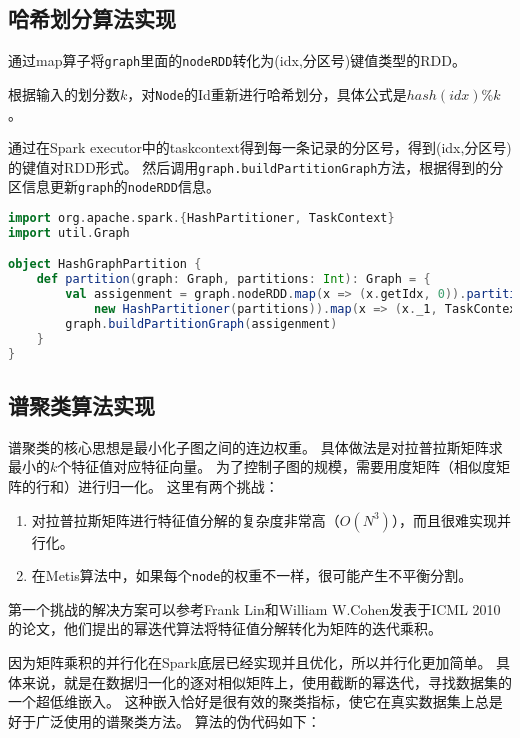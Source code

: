 \subsection{哈希划分算法实现}

通过map算子将\texttt{graph}里面的\texttt{nodeRDD}转化为(idx,分区号)键值类型的RDD。

根据输入的划分数$k$，对\texttt{Node}的Id重新进行哈希划分，具体公式是$hash(idx)\%k$。

通过在Spark executor中的taskcontext得到每一条记录的分区号，得到(idx,分区号)的键值对RDD形式。
然后调用\texttt{graph.buildPartitionGraph}方法，根据得到的分区信息更新\texttt{graph}的\texttt{nodeRDD}信息。

\begin{lstlisting}[language=Scala]
import org.apache.spark.{HashPartitioner, TaskContext}
import util.Graph

object HashGraphPartition {
    def partition(graph: Graph, partitions: Int): Graph = {
        val assigenment = graph.nodeRDD.map(x => (x.getIdx, 0)).partitionBy(
            new HashPartitioner(partitions)).map(x => (x._1, TaskContext.getPartitionId))
        graph.buildPartitionGraph(assigenment)
    }
}
\end{lstlisting}

\subsection{谱聚类算法实现}

谱聚类的核心思想是最小化子图之间的连边权重。
具体做法是对拉普拉斯矩阵求最小的$k$个特征值对应特征向量。
为了控制子图的规模，需要用度矩阵（相似度矩阵的行和）进行归一化。
这里有两个挑战：
\begin{enumerate}
    \item 对拉普拉斯矩阵进行特征值分解的复杂度非常高（$O(N^3)$），而且很难实现并行化。
    \item 在Metis算法中，如果每个\texttt{node}的权重不一样，很可能产生不平衡分割。
\end{enumerate}

第一个挑战的解决方案可以参考Frank Lin和William W.Cohen发表于ICML 2010的论文，他们提出的幂迭代算法将特征值分解转化为矩阵的迭代乘积。

因为矩阵乘积的并行化在Spark底层已经实现并且优化，所以并行化更加简单。
具体来说，就是在数据归一化的逐对相似矩阵上，使用截断的幂迭代，寻找数据集的一个超低维嵌入。
这种嵌入恰好是很有效的聚类指标，使它在真实数据集上总是好于广泛使用的谱聚类方法。
算法的伪代码如下：

